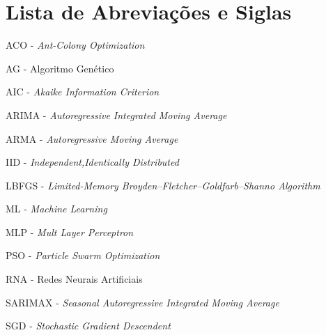 \chapter*{Lista de Abreviações e Siglas}
\linespread{1.5}

ACO - \textit{Ant-Colony Optimization}\bigskip

AG - Algoritmo Genético\bigskip

AIC - \textit{Akaike Information Criterion}\bigskip

ARIMA - \textit{Autoregressive Integrated Moving Average}\bigskip

ARMA - \textit{Autoregressive Moving Average}\bigskip

IID - \textit{Independent,Identically Distributed}\bigskip

LBFGS - \textit{Limited-Memory Broyden–Fletcher–Goldfarb–Shanno Algorithm}\bigskip

ML - \textit{Machine Learning}\bigskip

MLP - \textit{Mult Layer Perceptron}\bigskip

PSO - \textit{Particle Swarm Optimization}\bigskip

RNA - Redes Neurais Artificiais\bigskip

SARIMAX - \textit{Seasonal Autoregressive Integrated Moving Average}\bigskip

SGD - \textit{Stochastic Gradient Descendent}\bigskip


